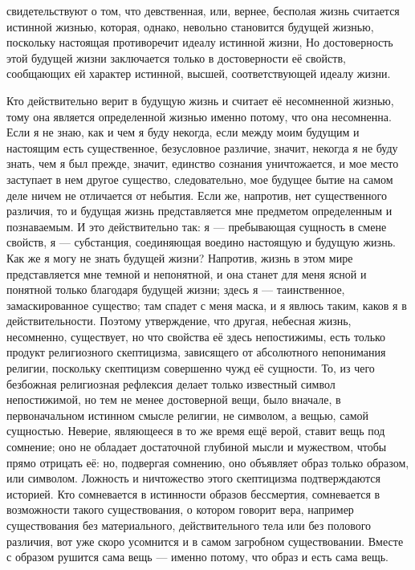 \documentclass[12pt,oneside]{book}
\begin{document}
свидетельствуют о том, что девственная, или, вернее, бесполая жизнь считается истинной жизнью, которая, однако, невольно становится будущей жизнью, поскольку настоящая противоречит идеалу истинной жизни, Но достоверность этой будущей жизни заключается только в достоверности её свойств, сообщающих ей характер истинной, высшей, соответствующей идеалу жизни.



Кто действительно верит в будущую жизнь и считает её несомненной жизнью, тому она является определенной жизнью именно потому, что она несомненна. Если я не знаю, как и чем я буду некогда, если между моим будущим и настоящим есть существенное, безусловное различие, значит, некогда я не буду знать, чем я был прежде, значит, единство сознания уничтожается, и мое место заступает в нем другое существо, следовательно, мое будущее бытие на самом деле ничем не отличается от небытия. Если же, напротив, нет существенного различия, то и будущая жизнь представляется мне предметом определенным и познаваемым. И это действительно так: я --- пребывающая сущность в смене свойств, я --- субстанция, соединяющая воедино настоящую и будущую жизнь. Как же я могу не знать будущей жизни? Напротив, жизнь в этом мире представляется мне темной и непонятной, и она станет для меня ясной и понятной только благодаря будущей жизни; здесь я --- таинственное, замаскированное существо; там спадет с меня маска, и я явлюсь таким, каков я в действительности. Поэтому утверждение, что другая, небесная жизнь, несомненно, существует, но что свойства её здесь непостижимы, есть только продукт религиозного скептицизма, зависящего от абсолютного непонимания религии, поскольку скептицизм совершенно чужд её сущности. То, из чего безбожная религиозная рефлексия делает только известный символ непостижимой, но тем не менее достоверной вещи, было вначале, в первоначальном истинном смысле религии, не символом, а вещью, самой сущностью. Неверие, являющееся в то же время ещё верой, ставит вещь под сомнение; оно не обладает достаточной глубиной мысли и мужеством, чтобы прямо отрицать её: но, подвергая сомнению, оно объявляет образ только образом, или символом. Ложность и ничтожество этого скептицизма подтверждаются историей. Кто сомневается в истинности образов бессмертия, сомневается в возможности такого существования, о котором говорит вера, например существования без материального, действительного тела или без полового различия, вот уже скоро усомнится и в самом загробном существовании. Вместе с образом рушится сама вещь --- именно потому, что образ и есть сама вещь.
\end{document}
